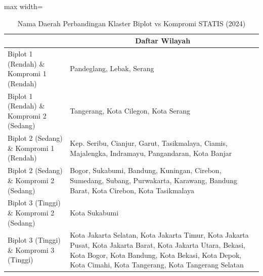 \begin{table}[H]
\centering
\caption{Nama Daerah Perbandingan Klaster Biplot vs Kompromi STATIS (2024)} \label{tab:app2biplot_comp_name_2024}
\begin{adjustbox}{max width=\textwidth}
\begin{tabular}{|>{\centering\arraybackslash}p{4cm}|p{10cm}|}
\hline
\multicolumn{1}{|c|}{\textbf{Kategori}} & \multicolumn{1}{c|}{\textbf{Daftar Wilayah}} \\
\hline
Biplot 1 (Rendah) \& Kompromi 1 (Rendah) & Pandeglang, Lebak, Serang \\
\hline
Biplot 1 (Rendah) \& Kompromi 2 (Sedang) & Tangerang, Kota Cilegon, Kota Serang \\
\hline
Biplot 2 (Sedang) \& Kompromi 1 (Rendah) & Kep. Seribu, Cianjur, Garut, Tasikmalaya, Ciamis, Majalengka, Indramayu, Pangandaran, Kota Banjar \\
\hline
Biplot 2 (Sedang) \& Kompromi 2 (Sedang) & Bogor, Sukabumi, Bandung, Kuningan, Cirebon, Sumedang, Subang, Purwakarta, Karawang, Bandung Barat, Kota Cirebon, Kota Tasikmalaya \\
\hline
Biplot 3 (Tinggi) \& Kompromi 2 (Sedang) & Kota Sukabumi \\
\hline
Biplot 3 (Tinggi) \& Kompromi 3 (Tinggi) & Kota Jakarta Selatan, Kota Jakarta Timur, Kota Jakarta Pusat, Kota Jakarta Barat, Kota Jakarta Utara, Bekasi, Kota Bogor, Kota Bandung, Kota Bekasi, Kota Depok, Kota Cimahi, Kota Tangerang, Kota Tangerang Selatan \\
\hline
\end{tabular}
\end{adjustbox}
\end{table}